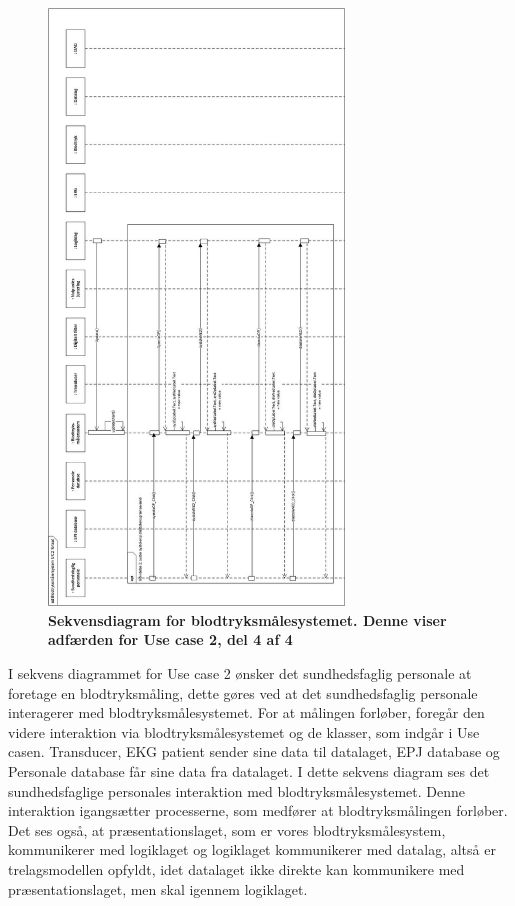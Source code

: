 \begin{figure}[H]
\includegraphics[width =0.7\textwidth , center]{billeder/sdUC2_4}
\caption{\textbf{Sekvensdiagram for blodtryksmålesystemet. Denne viser adfærden for Use case 2, del 4 af 4}}
\end{figure}
I sekvens diagrammet for Use case 2 ønsker det sundhedsfaglig personale at foretage en blodtryksmåling, dette gøres ved at det sundhedsfaglig personale interagerer med blodtryksmålesystemet. For at målingen forløber, foregår den videre interaktion via blodtryksmålesystemet og de klasser, som indgår i Use casen. Transducer, EKG patient sender sine data til datalaget, EPJ database og Personale database får sine data fra datalaget. I dette sekvens diagram ses det sundhedsfaglige personales interaktion med blodtryksmålesystemet. Denne interaktion igangsætter processerne, som medfører at blodtryksmålingen forløber. Det ses også, at præsentationslaget, som er vores blodtryksmålesystem, kommunikerer med logiklaget og logiklaget kommunikerer med datalag, altså er trelagsmodellen opfyldt, idet datalaget ikke direkte kan kommunikere med præsentationslaget, men skal igennem logiklaget. \\\\
